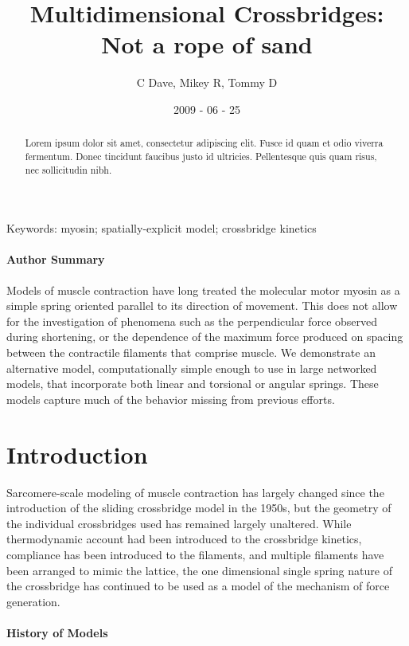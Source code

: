 \documentclass[]{article}
\title{Multidimensional Crossbridges: Not a rope of sand}
\author{C Dave, Mikey R, Tommy D}
\date{2009 - 06 - 25}
\begin{document}
\maketitle

 
\begin{abstract}
	Lorem ipsum dolor sit amet, consectetur adipiscing elit. Fusce id quam et odio viverra fermentum. Donec tincidunt faucibus justo id ultricies. Pellentesque quis quam risus, nec sollicitudin nibh. 
\end{abstract}

Keywords: myosin; spatially-explicit model; crossbridge kinetics

\paragraph{Author Summary} %
Models of muscle contraction have long treated the molecular motor myosin as a simple spring oriented parallel to its direction of movement. 
This does not allow for the investigation of phenomena such as the perpendicular force observed during shortening, or the dependence of the maximum force produced on spacing between the contractile filaments that comprise muscle.
We demonstrate an alternative model, computationally simple enough to use in large networked models, that incorporate both linear and torsional or angular springs. These models capture much of the behavior missing from previous efforts.

\section{Introduction} %

Sarcomere-scale modeling of muscle contraction has largely changed since the introduction of the sliding crossbridge model in the 1950s, but the geometry of the individual crossbridges used has remained largely unaltered. 
While thermodynamic account had been introduced to the crossbridge kinetics, compliance has been introduced to the filaments, and multiple filaments have been arranged to mimic the lattice, the one dimensional single spring nature of the crossbridge has continued to be used as a model of the mechanism of force generation.

\paragraph*{History of Models}
\end{document}
